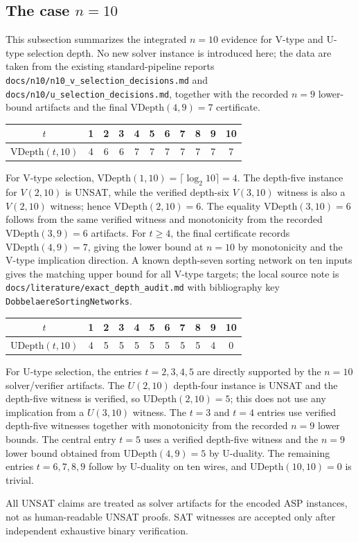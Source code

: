 \subsection{The case $n=10$}

This subsection summarizes the integrated $n=10$ evidence for V-type and U-type
selection depth. No new solver instance is introduced here; the data are taken
from the existing standard-pipeline reports
\texttt{docs/n10/n10\_v\_selection\_decisions.md} and
\texttt{docs/n10/u\_selection\_decisions.md}, together with the recorded
$n=9$ lower-bound artifacts and the final $\mathrm{VDepth}(4,9)=7$ certificate.

\begin{center}
\begin{tabular}{c|cccccccccc}
$t$ & 1 & 2 & 3 & 4 & 5 & 6 & 7 & 8 & 9 & 10 \\
\hline
$\mathrm{VDepth}(t,10)$ & 4 & 6 & 6 & 7 & 7 & 7 & 7 & 7 & 7 & 7 \\
\end{tabular}
\end{center}

For V-type selection, $\mathrm{VDepth}(1,10)=\lceil\log_2 10\rceil=4$.
The depth-five instance for $V(2,10)$ is UNSAT, while the verified depth-six
$V(3,10)$ witness is also a $V(2,10)$ witness; hence
$\mathrm{VDepth}(2,10)=6$.  The equality
$\mathrm{VDepth}(3,10)=6$ follows from the same verified witness and
monotonicity from the recorded $\mathrm{VDepth}(3,9)=6$ artifacts.  For
$t\ge 4$, the final certificate records $\mathrm{VDepth}(4,9)=7$, giving the
lower bound at $n=10$ by monotonicity and the V-type implication direction.  A
known depth-seven sorting network on ten inputs gives the matching upper bound
for all V-type targets; the local source note is
\texttt{docs/literature/exact\_depth\_audit.md} with bibliography key
\texttt{DobbelaereSortingNetworks}.

\begin{center}
\begin{tabular}{c|cccccccccc}
$t$ & 1 & 2 & 3 & 4 & 5 & 6 & 7 & 8 & 9 & 10 \\
\hline
$\mathrm{UDepth}(t,10)$ & 4 & 5 & 5 & 5 & 5 & 5 & 5 & 5 & 4 & 0 \\
\end{tabular}
\end{center}

For U-type selection, the entries $t=2,3,4,5$ are directly supported by the
$n=10$ solver/verifier artifacts.  The $U(2,10)$ depth-four instance is UNSAT
and the depth-five witness is verified, so $\mathrm{UDepth}(2,10)=5$; this does
not use any implication from a $U(3,10)$ witness.  The $t=3$ and $t=4$ entries
use verified depth-five witnesses together with monotonicity from the recorded
$n=9$ lower bounds.  The central entry $t=5$ uses a verified depth-five witness
and the $n=9$ lower bound obtained from $\mathrm{UDepth}(4,9)=5$ by U-duality.
The remaining entries $t=6,7,8,9$ follow by U-duality on ten wires, and
$\mathrm{UDepth}(10,10)=0$ is trivial.

All UNSAT claims are treated as solver artifacts for the encoded ASP instances,
not as human-readable UNSAT proofs.  SAT witnesses are accepted only after
independent exhaustive binary verification.
